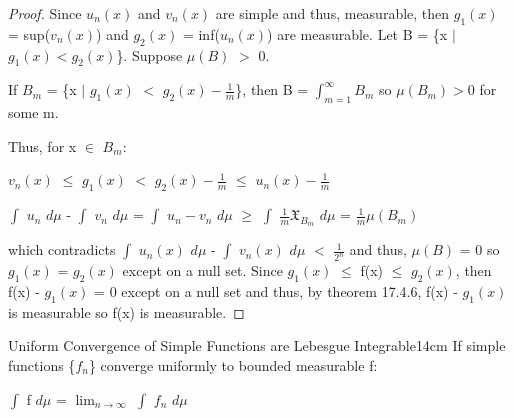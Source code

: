 \begin{proof}
        Since $u_n(x)$ and $v_n(x)$ are simple and thus, measurable,
        then $g_1(x)$ = sup($v_n(x)$) and $g_2(x)$ = inf($u_n(x)$)
        are measurable.
        Let B = \{x $|$ $g_1(x) < g_2(x)$\}. Suppose $\mu(B)$ $>$ 0.

        If $B_m$ = \{x $|$ $g_1(x)$ $<$ $g_2(x) - \frac{1}{m}$\},
        then B = $\int_{m=1}^{\infty} B_m$
        so $\mu(B_m) > 0$ for some m.
        
        Thus, for x $\in$ $B_m$:

        \hspace{0.5cm}
        $v_n(x)$
        $\leq$ $g_1(x)$
        $<$ $g_2(x) - \frac{1}{m}$
        $\leq$ $u_n(x) - \frac{1}{m}$

        \hspace{0.5cm}
        $\int$ $u_n$ $d\mu$ - $\int$ $v_n$ $d\mu$
        = $\int$ $u_n - v_n$ $d\mu$
        $\geq$ $\int$ $\frac{1}{m} \mathfrak{X}_{B_m}$ $d\mu$
        = $\frac{1}{m} \mu(B_m)$

        which contradicts
        $\int$ $u_n(x)$ $d\mu$ - $\int$ $v_n(x)$ $d\mu$ $<$ $\frac{1}{2^n}$
        and thus, $\mu(B)$ = 0
        so $g_1(x)$ = $g_2(x)$ except on a null set.
        Since $g_1(x)$ $\leq$ f(x) $\leq$ $g_2(x)$, then
        f(x) - $g_1(x)$ = 0 except on a null set and thus,
        by {\color{red} theorem 17.4.6}, f(x) - $g_1(x)$ is measurable
        so f(x) is measurable.
    \end{proof}

    \vspace{0.5cm}



    \begin{wtheorem}{Uniform Convergence of Simple Functions are
    Lebesgue Integrable}{14cm}
        If simple functions \{$f_n$\} converge uniformly to bounded measurable f:

        \hspace{0.5cm}
        $\int$ f $d\mu$ = $\lim_{n \rightarrow \infty}$ $\int$ $f_n$ $d\mu$
    \end{wtheorem}

